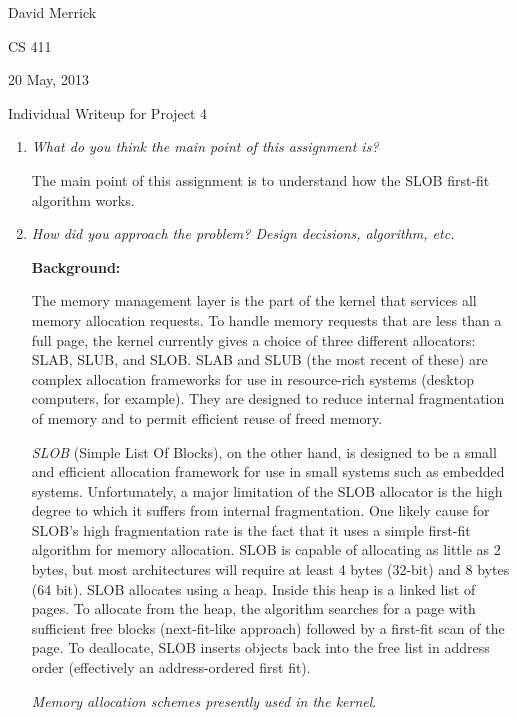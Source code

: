 \documentclass[letterpaper,10pt,titlepage]{article}
\newcommand{\tab}{\hspace*{2em}} %
\def\name{David Merrick}
\def\project{Project 4}
\def\date{20 May, 2013}
\begin{document}
\name

CS 411

\date

\begin{center}
{\LARGE Individual Writeup for \project}
\end{center}

\begin{enumerate} 
\item \emph{What do you think the main point of this assignment is?}

\tab The main point of this assignment is to understand how the SLOB first-fit algorithm works.

\newline
\item \emph{How did you approach the problem? Design decisions, algorithm, etc.}

\newline
\textbf{Background:} 

\tab The memory management layer is the part of the kernel that services all memory allocation requests. To handle memory requests that are less than a full page, the kernel currently gives a choice of three different allocators: SLAB, SLUB, and SLOB. SLAB and SLUB (the most recent of these) are complex allocation frameworks for use in resource-rich systems (desktop computers, for example). They are designed to reduce internal fragmentation of memory and to permit efficient reuse of freed memory. 

\tab \emph{SLOB} (Simple List Of Blocks), on the other hand, is designed to be a small and efficient allocation framework for use in small systems such as embedded systems. Unfortunately, a major limitation of the SLOB allocator is the high degree to which it suffers from internal fragmentation. One likely cause for SLOB’s high fragmentation rate is the fact that it uses a simple first-fit algorithm for memory allocation. SLOB is capable of allocating as little as 2 bytes, but most architectures will require at least 4 bytes (32-bit) and 8 bytes (64 bit). SLOB allocates using a heap. Inside this heap is a linked list of pages. To allocate from the heap, the algorithm searches for a page with sufficient free blocks (next-fit-like approach) followed by a first-fit scan of the page. To deallocate, SLOB inserts objects back into the free list in address order (effectively an address-ordered first fit).


\tab \emph{Memory allocation schemes presently used in the kernel}. 


\end{enumerate}
\end{document}
